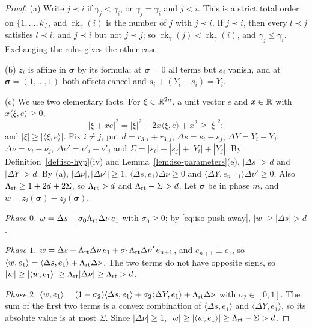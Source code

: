 \begin{proof}
(a) Write $j\prec i$ if $\gamma_j<\gamma_i$, or $\gamma_j=\gamma_i$ and $j<i$. This is a strict total order on
$\{1,\dots,k\}$, and $\operatorname{rk}_\gamma(i)$ is the number of $j$ with $j\prec i$. If $j\prec i$, then every $l\prec j$
satisfies $l\prec i$, and $j\prec i$ but not $j\prec j$; so $\operatorname{rk}_\gamma(j)<\operatorname{rk}_\gamma(i)$, and
$\gamma_j\le\gamma_i$. Exchanging the roles gives the other case.

(b) $z_i$ is affine in $\boldsymbol\sigma$ by its formula; at $\boldsymbol\sigma=0$ all terms but $s_i$ vanish, and at
$\boldsymbol\sigma=(1,\dots,1)$ both offsets cancel and $s_i+(Y_i-s_i)=Y_i$.

(c) We use two elementary facts. For $\xi\in\mathbb{R}^{2n}$, a unit vector $e$ and $x\in\mathbb{R}$ with $x\langle\xi,e\rangle\ge0$,
\begin{equation}\label{eq:iso-push-away}
 |\xi+xe|^2=|\xi|^2+2x\langle\xi,e\rangle+x^2\ge|\xi|^2 ;
\end{equation}
and $|\xi|\ge|\langle\xi,e\rangle|$. Fix $i\ne j$, put $d=r_{3,i}+r_{3,j}$, $\Delta s=s_i-s_j$, $\Delta Y=Y_i-Y_j$,
$\Delta\nu=\nu_i-\nu_j$, $\Delta\nu'=\nu'_i-\nu'_j$ and $\Sigma=|s_i|+|s_j|+|Y_i|+|Y_j|$. By
Definition~\ref{def:iso-hyp}(iv) and Lemma~\ref{lem:iso-parameters}(e), $|\Delta s|>d$ and $|\Delta Y|>d$. By (a),
$|\Delta\nu|,|\Delta\nu'|\ge1$, $\langle\Delta s,e_1\rangle\Delta\nu\ge0$ and $\langle\Delta Y,e_{n+1}\rangle\Delta\nu'\ge0$. Also
$\Lambda_{\rm rt}\ge1+2d+2\Sigma$, so $\Lambda_{\rm rt}>d$ and $\Lambda_{\rm rt}-\Sigma>d$. Let $\boldsymbol\sigma$ be in phase $m$, and
$w=z_i(\boldsymbol\sigma)-z_j(\boldsymbol\sigma)$.

\emph{Phase $0$.} $w=\Delta s+\sigma_0\Lambda_{\rm rt}\Delta\nu\,e_1$ with $\sigma_0\ge0$; by \eqref{eq:iso-push-away},
$|w|\ge|\Delta s|>d$.

\emph{Phase $1$.} $w=\Delta s+\Lambda_{\rm rt}\Delta\nu\,e_1+\sigma_1\Lambda_{\rm rt}\Delta\nu'\,e_{n+1}$, and $e_{n+1}\perp e_1$, so
$\langle w,e_1\rangle=\langle\Delta s,e_1\rangle+\Lambda_{\rm rt}\Delta\nu$. The two terms do not have opposite signs, so
$|w|\ge|\langle w,e_1\rangle|\ge\Lambda_{\rm rt}|\Delta\nu|\ge\Lambda_{\rm rt}>d$.

\emph{Phase $2$.} $\langle w,e_1\rangle=(1-\sigma_2)\langle\Delta s,e_1\rangle+\sigma_2\langle\Delta Y,e_1\rangle+\Lambda_{\rm rt}\Delta\nu$
with $\sigma_2\in[0,1]$. The sum of the first two terms is a convex combination of $\langle\Delta s,e_1\rangle$ and
$\langle\Delta Y,e_1\rangle$, so its absolute value is at most $\Sigma$. Since $|\Delta\nu|\ge1$,
$|w|\ge|\langle w,e_1\rangle|\ge\Lambda_{\rm rt}-\Sigma>d$.


\end{proof}
